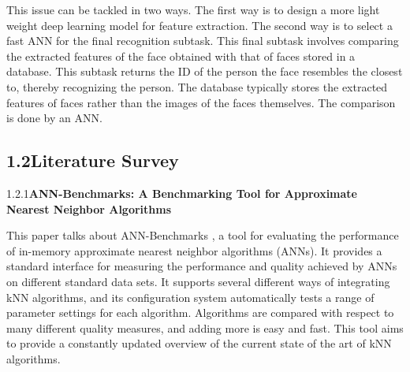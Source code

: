 \documentclass[12pt]{article}
\renewcommand{\_}{\kern-1.5pt\textunderscore\kern-1.5pt}
\begin{document}
\begin{justify}
This issue can be tackled in two ways. The first way is to design a more light weight deep learning model for feature extraction. The second way is to select a fast ANN for the final recognition subtask. This final subtask involves comparing the extracted features of the face obtained with that of faces stored in a database. This subtask returns the ID of the person the face resembles the closest to, thereby recognizing the person. The database typically stores the extracted features of faces rather than the images of the faces themselves. The comparison is done by an ANN.
\end{justify}\par

\subsection*{1.2\hspace*{10pt}Literature Survey}
1.2.1\tab \textbf{ANN-Benchmarks: A Benchmarking Tool for Approximate Nearest Neighbor Algorithms }\par
This paper talks about ANN-Benchmarks \cite{aumuller2017ann} , a tool for evaluating the performance of in-memory approximate nearest neighbor algorithms (ANNs). It provides a standard interface for measuring the performance and quality achieved by ANNs on different standard data sets. It supports several different ways of integrating kNN algorithms, and its configuration system automatically tests a range of parameter settings for each algorithm. Algorithms are compared with respect to many different quality measures, and adding more is easy and fast. This tool aims to provide a constantly updated overview of the current state of the art of kNN algorithms. \par
\end{document}
